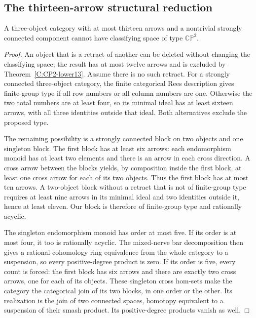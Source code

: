 \subsection{The thirteen-arrow structural reduction}

\begin{lemma}\label{C:thirteen-three-SCC}
A three-object category with at most thirteen arrows and a
nontrivial strongly connected component cannot have classifying
space of type $\mathbb{CP}^2$.
\end{lemma}
\begin{proof}
An object that is a retract of another can be deleted without
changing the classifying space; the result has at most twelve
arrows and is excluded by Theorem~\ref{C:CP2-lower13}.
Assume there is no such retract.
For a strongly connected three-object category, the finite
categorical Rees description gives finite-group type if all row
numbers or all column numbers are one. Otherwise the two total
numbers are at least four, so its minimal ideal has at least
sixteen arrows, with all three identities outside that ideal.
Both alternatives exclude the proposed type.

The remaining possibility is a strongly connected block on two
objects and one singleton block. The first block has at least six
arrows: each endomorphism monoid has at least two elements and
there is an arrow in each cross direction. A cross arrow between
the blocks yields, by composition inside the first block, at least
one cross arrow for each of its two objects. Thus the first block
has at most ten arrows. A two-object block without a retract that
is not of finite-group type requires at least nine arrows in its
minimal ideal and two identities outside it, hence at least eleven.
Our block is therefore of finite-group type and rationally acyclic.

The singleton endomorphism monoid has order at most five. If its
order is at most four, it too is rationally acyclic. The mixed-nerve
bar decomposition then gives a rational cohomology ring equivalence
from the whole category to a suspension, so every positive-degree
product is zero. If its order is five, every count is forced:
the first block has six arrows and there are exactly two cross
arrows, one for each of its objects. These singleton cross hom-sets
make the category the categorical join of its two blocks, in one
order or the other. Its realization is the join of two connected
spaces, homotopy equivalent to a suspension of their smash product.
Its positive-degree products vanish as well.
\end{proof}

